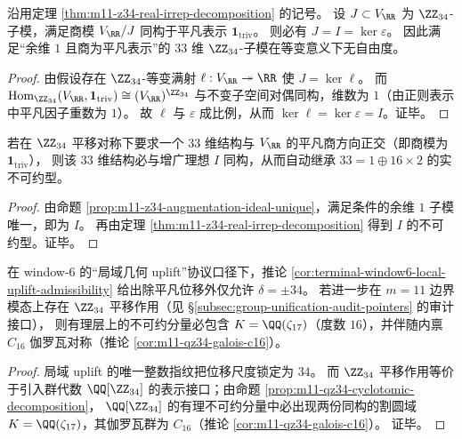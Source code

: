 \begin{proposition}\label{prop:m11-z34-augmentation-ideal-unique}
沿用定理 \ref{thm:m11-z34-real-irrep-decomposition} 的记号。
设 \(J\subset V_{\RR}\) 为 \(\ZZ_{34}\)-子模，满足商模 \(V_{\RR}/J\) 同构于平凡表示 \(\mathbf 1_{\mathrm{triv}}\)。
则必有 \(J=I=\ker\varepsilon\)。
因此满足“余维 \(1\) 且商为平凡表示”的 \(33\) 维 \(\ZZ_{34}\)-子模在等变意义下无自由度。
\end{proposition}
\begin{proof}
由假设存在 \(\ZZ_{34}\)-等变满射 \(\ell:V_{\RR}\twoheadrightarrow \RR\) 使 \(J=\ker\ell\)。
而
\(
\mathrm{Hom}_{\ZZ_{34}}(V_{\RR},\mathbf 1_{\mathrm{triv}})
\cong
(V_{\RR})^{\ZZ_{34}}
\)
与不变子空间对偶同构，维数为 \(1\)（由正则表示中平凡因子重数为 \(1\)）。
故 \(\ell\) 与 \(\varepsilon\) 成比例，从而 \(\ker\ell=\ker\varepsilon=I\)。证毕。
\end{proof}

\begin{corollary}[维数补余的表示论锁定：\texorpdfstring{$33=45-12$}{33=45-12} 的唯一模实现]\label{cor:m11-z34-unique-33-module}
若在 \(\ZZ_{34}\) 平移对称下要求一个 \(33\) 维结构与 \(V_{\RR}\) 的平凡商方向正交（即商模为 \(\mathbf 1_{\mathrm{triv}}\)），
则该 \(33\) 维结构必与增广理想 \(I\) 同构，从而自动继承 \(33=1\oplus 16\times 2\) 的实不可约型。
\end{corollary}
\begin{proof}
由命题 \ref{prop:m11-z34-augmentation-ideal-unique}，满足条件的余维 \(1\) 子模唯一，即为 \(I\)。
再由定理 \ref{thm:m11-z34-real-irrep-decomposition} 得到 \(I\) 的不可约型。证毕。
\end{proof}

\begin{corollary}\label{cor:window6-local-uplift-forces-cyclotomic17}
在 window-\(6\) 的“局域几何 uplift”协议口径下，推论 \ref{cor:terminal-window6-local-uplift-admissibility} 给出除平凡位移外仅允许 \(\delta=\pm 34\)。
若进一步在 \(m=11\) 边界模态上存在 \(\ZZ_{34}\) 平移作用（见 \S\ref{subsec:group-unification-audit-pointers} 的审计接口），
则有理层上的不可约分量必包含 \(K=\QQ(\zeta_{17})\)（度数 \(16\)），并伴随内禀 \(C_{16}\) 伽罗瓦对称（推论 \ref{cor:m11-qz34-galois-c16}）。
\end{corollary}
\begin{proof}
局域 uplift 的唯一整数指纹把位移尺度锁定为 \(34\)。
而 \(\ZZ_{34}\) 平移作用等价于引入群代数 \(\QQ[\ZZ_{34}]\) 的表示接口；由命题 \ref{prop:m11-qz34-cyclotomic-decomposition}，
\(\QQ[\ZZ_{34}]\) 的有理不可约分量中必出现两份同构的割圆域 \(K=\QQ(\zeta_{17})\)，其伽罗瓦群为 \(C_{16}\)（推论 \ref{cor:m11-qz34-galois-c16}）。
证毕。
\end{proof}

